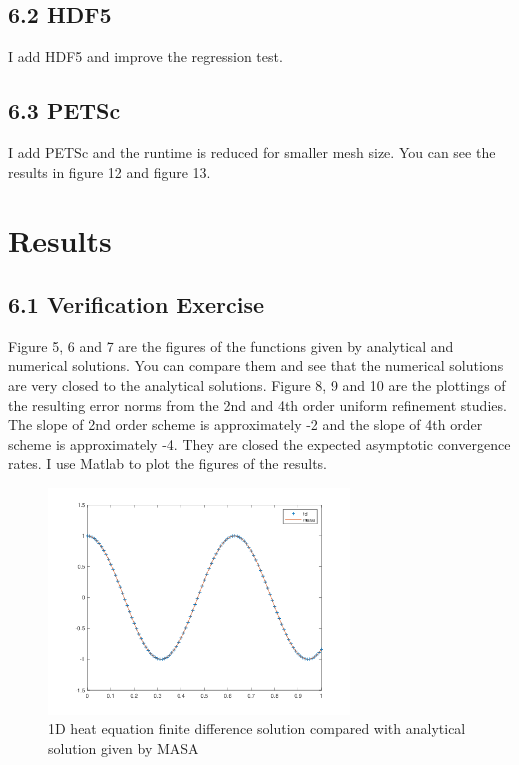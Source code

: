 \documentclass{article}
\begin{document}
\subsection*{6.2 HDF5}
I add HDF5 and improve the regression test.

\subsection*{6.3 PETSc}
I add PETSc and the runtime is reduced for smaller mesh size. You can see the results in figure 12 and figure 13.

\section{Results}

\subsection*{6.1 Verification Exercise}
Figure 5, 6 and 7 are the figures of the functions given by analytical and numerical solutions. You can compare them and see that the numerical solutions are very closed to the analytical solutions. Figure 8, 9 and 10 are the plottings of the resulting error norms from the 2nd and 4th order uniform refinement studies. The slope of 2nd order scheme is approximately -2 and the slope of 4th order scheme is approximately -4. They are closed the expected asymptotic convergence rates. I use Matlab to plot the figures of the results.


\begin{figure}[h!]
  \includegraphics[width=8cm]{figure_4}
  \caption{1D heat equation finite difference solution compared with analytical solution given by MASA}
\end{figure}
\end{document}
